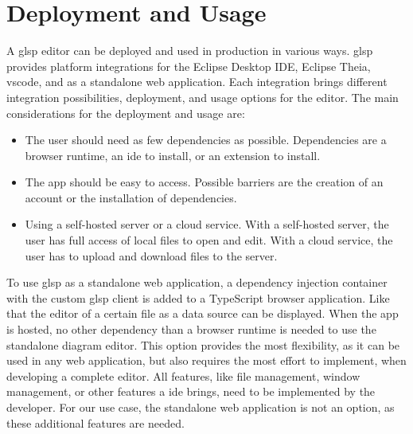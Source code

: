 \chapter{Deployment and Usage}
\label{sec:deployment}

A \ac{glsp} editor can be deployed and used in production in various ways. \ac{glsp} provides platform integrations for the Eclipse Desktop IDE, Eclipse Theia, \ac{vscode}, and as a standalone web application. Each integration brings different integration possibilities, deployment, and usage options for the editor. \cite{glsp-doc} The main considerations for the deployment and usage are:
  \begin{itemize}
    \item The user should need as few dependencies as possible. Dependencies are a browser runtime, an \acs{ide} to install, or an extension to install.
    \item The app should be easy to access. Possible barriers are the creation of an account or the installation of dependencies.
    \item Using a self-hosted server or a cloud service. With a self-hosted server, the user has full access of local files to open and edit. With a cloud service, the user has to upload and download files to the server.
  \end{itemize}
  
  To use \ac{glsp} as a standalone web application, a dependency injection container with the custom \ac{glsp} client is added to a TypeScript browser application. Like that the editor of a certain file as a data source can be displayed. When the app is hosted, no other dependency than a browser runtime is needed to use the standalone diagram editor. \cite{glsp-client-repo} This option provides the most flexibility, as it can be used in any web application, but also requires the most effort to implement, when developing a complete editor. All features, like file management, window management, or other features a \acs{ide} brings, need to be implemented by the developer. \cite{glsp-client-repo} For our use case, the standalone web application is not an option, as these additional features are needed. 

